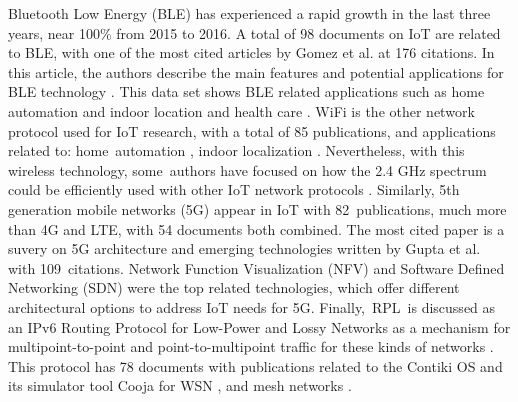 \documentclass[symmetry,article,accept,moreauthors,pdftex10pt,a4paper]{mdpi}
\begin{document}
Bluetooth Low Energy (BLE) has experienced a rapid growth in the last three years, near 100\% from 2015 to 2016. A total of 98 documents on IoT are related to BLE, with one of the most cited articles by Gomez et al. at 176 citations. In this article, the authors describe the main features and potential applications for BLE technology \cite{Gomez201211734}. This data set shows BLE related applications such as home automation \cite{Horvat2016435,Pham-Huu201675,Papp2016366} and indoor location \cite{Kudeshia20161,Peng2017794,Vasilateanu2016} and health care \cite{Kang2016313,Touati20161271,Fafoutis20161}. WiFi is the other network protocol used for IoT research, with a total of 85 publications, and applications related to: home~automation \cite{Gao2016526,Airola2015111}, indoor localization \cite{Nambiar2017952}. Nevertheless, with this wireless technology, some~authors have focused on how the 2.4 GHz spectrum could be efficiently used with other IoT network protocols \cite{Zhang2012504,Samuel2016364,Rajandekar2015681,King201445,Lim2015,Shi2015204,Ndih20161835}. Similarly, 5th generation mobile networks (5G) appear in IoT with 82~publications, much more than 4G and LTE, with 54 documents both combined. The most cited paper is a suvery on 5G architecture and emerging technologies written by Gupta et al. \cite{Gupta20151206} with 109~citations. Network Function Visualization (NFV) and Software Defined Networking (SDN) \cite{Costa-Requena2015154,Uher2016,Kljaic2016587} were the top related technologies, which offer different architectural options to address IoT needs for 5G. Finally,~RPL~is discussed as an IPv6 Routing Protocol for Low-Power and Lossy Networks as a mechanism for multipoint-to-point and point-to-multipoint traffic for these kinds of networks \cite{rfc6550}. This protocol has 78 documents with publications related to the Contiki OS and its simulator tool Cooja for WSN \cite{GauthamKrishna2016270,Ancillotti20131275}, and mesh networks \cite{Vittecoq2013530,Duquennoy2015337,Sebastian2017127}.
\end{document}
